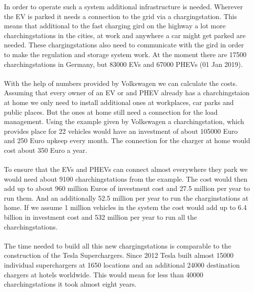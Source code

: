 \documentclass[12pt,a4paper]{article}
\begin{document}
\begin{parcolumns}[colwidths={1=2.5 cm, 2=10 cm, 3=2.5cm}]{3}
{\noindent
In order to operate such a system additional infrastructure is needed. Wherever the EV is parked it needs a connection to the grid via a chargingstation. This means that additional to the fast charging gird on the highway a lot more charchingstations in the cities, at work and anywhere a car might get parked are needed. These chargingstations also need to communicate with the gird in order to make the regulation and storage system work.
At the moment there are 17500 charchingstations in Germany, but 83000 EVs and 67000 PHEVs (01 Jan 2019).
\\ \\
With the help of numbers provided by Volkswagen we can calculate the costs. Assuming that every owner of an EV or and PHEV already has a charchingstaion at home we only need to install additional ones at workplaces, car parks and public places. But the ones at home still need a connection for the load management. Using the example given by Volkswagen a charchingstation, which provides place for 22 vehicles would have an investment of about 105000 Euro and 250 Euro upkeep every month. The connection for the charger at home would cost about 350 Euro a year.
\\ \\
To ensure that the EVs and PHEVs can connect almost everywhere they park we would need about 9100 charchingstations from the example.
The cost would then add up to about 960 million Euros of investment cost and 27.5 million per year to run them. And an additionally 52.5 million per year to run the charginstations at home.
If we assume 1 million vehicles in the system the cost would add up to 6.4 billion in investment cost and 532 million per year to run all the charchingstations.
\\ \\
\noindent
The time needed to build all this new chargingstations is comparable to the construction of the Tesla Superchargers. Since 2012 Tesla built almost 15000 individual superchargers at 1650 locations and an additional 24000 destination chargers at hotels worldwide. This would mean for less than 40000 charchingstations it took almost eight years.
}
\end{parcolumns}
\end{document}
